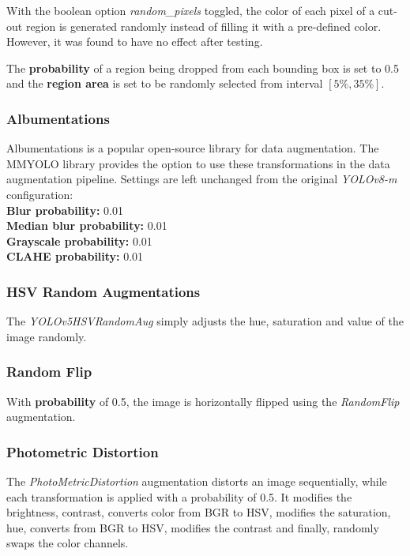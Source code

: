 With the boolean option \textit{random\_pixels} toggled, the color of each pixel
of a cut-out region is generated randomly instead of filling it with a
pre-defined color. However, it was found to have no effect after testing.

The \textbf{probability} of a region being dropped from each bounding box is set
to 0.5 and the \textbf{region area} is set to be randomly selected from
interval $[5\%, 35\%]$.

\subsubsection*{Albumentations}

Albumentations\cite{Albumentations} is a popular open-source library for data
augmentation. The MMYOLO  library provides the option
to use these transformations in the data augmentation pipeline. Settings are left unchanged from the original 
\textit{YOLOv8-m} configuration: \\
\textbf{Blur probability:} 0.01 \\
\textbf{Median blur probability:} 0.01 \\
\textbf{Grayscale probability:} 0.01 \\
\textbf{CLAHE probability:} 0.01

\subsubsection*{HSV Random Augmentations}

The \textit{YOLOv5HSVRandomAug} simply adjusts the hue, saturation and value of
the image randomly.

\subsubsection*{Random Flip}

With \textbf{probability} of 0.5, the image is horizontally flipped using the
\textit{RandomFlip} augmentation.

\subsubsection*{Photometric Distortion}

The \textit{PhotoMetricDistortion} augmentation distorts an image sequentially,
while each transformation is applied with a probability of 0.5. It modifies the
brightness, contrast, converts color from BGR to HSV, modifies the saturation,
hue, converts from BGR to HSV, modifies the contrast and finally, randomly swaps
the color channels.

